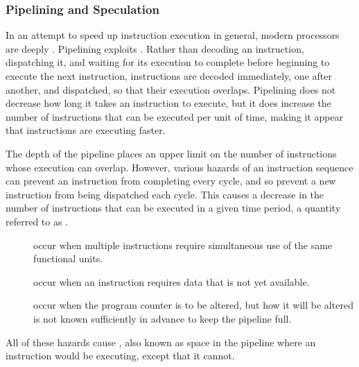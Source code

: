 \subsubsection{Pipelining and Speculation}
In an attempt to speed up instruction execution in general, modern processors are deeply . Pipelining exploits . Rather than decoding an instruction, dispatching it, and waiting for its execution to complete before beginning to execute the next instruction, instructions are decoded immediately, one after another, and dispatched, so that their execution overlaps. Pipelining does not decrease how long it takes an instruction to execute, but it does increase the number of instructions that can be executed per unit of time, making it appear that instructions are executing faster.

The depth of the pipeline places an upper limit on the number of instructions whose execution can overlap. However, various hazards of an instruction sequence can prevent an instruction from completing every cycle, and so prevent a new instruction from being dispatched each cycle. This causes a decrease in the number of instructions that can be executed in a given time period, a quantity referred to as .
\begin{description}
\item[] occur when multiple instructions require simultaneous use of the same functional units.
\item[] occur when an instruction requires data that is not yet available.
\item[] occur when the program counter is to be altered, but how it will be altered is not known sufficiently in advance to keep the pipeline full.
\end{description}
All of these hazards cause , also known as \empause space in the pipeline where an instruction would be executing, except that it cannot.

